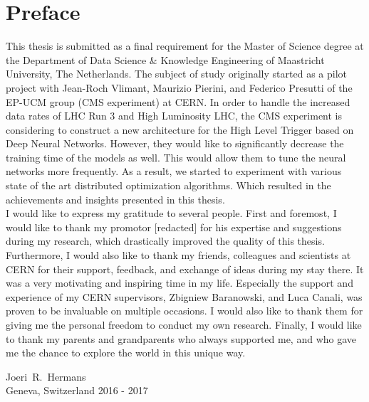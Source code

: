 %
%
%

\newpage
\chapter*{Preface}

This thesis is submitted as a final requirement for the Master of Science degree at the Department of Data Science \& Knowledge Engineering of Maastricht University, The Netherlands. The subject of study originally started as a pilot project with Jean-Roch Vlimant, Maurizio Pierini, and Federico Presutti of the EP-UCM group (CMS experiment) at CERN. In order to handle the increased data rates of LHC Run 3 and High Luminosity LHC, the CMS experiment is considering to construct a new architecture for the High Level Trigger based on Deep Neural Networks. However, they would like to significantly decrease the training time of the models as well. This would allow them to tune the neural networks more frequently. As a result, we started to experiment with various state of the art distributed optimization algorithms. Which resulted in the achievements and insights presented in this thesis.\\

I would like to express my gratitude to several people. First and foremost, I would like to thank my promotor [redacted] for his expertise and suggestions during my research, which drastically improved the quality of this thesis. Furthermore, I would also like to thank my friends, colleagues and scientists at CERN for their support, feedback, and exchange of ideas during my stay there. It was a very motivating and inspiring time in my life. Especially the support and experience of my CERN supervisors, Zbigniew Baranowski, and Luca Canali, was proven to be invaluable on multiple occasions. I would also like to thank them for giving me the personal freedom to conduct my own research. Finally, I would like to thank my parents and grandparents who always supported me, and who gave me the chance to explore the world in this unique way.

\vspace{1cm}
\begin{flushright}
Joeri~R.~Hermans\\
Geneva, Switzerland 2016 - 2017
\end{flushright}
